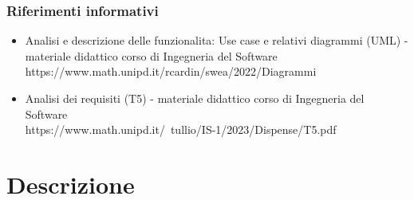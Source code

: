 \subsubsection{Riferimenti informativi}\label{sec:riferimenti_informativi}
\begin{itemize}
    \item Analisi e descrizione delle funzionalita: Use case e relativi diagrammi (UML) - materiale didattico corso
    di Ingegneria del Software\\
    https://www.math.unipd.it/rcardin/swea/2022/Diagrammi%
    \item Analisi dei requisiti (T5) - materiale didattico corso di Ingegneria del Software\\
    https://www.math.unipd.it/~tullio/IS-1/2023/Dispense/T5.pdf
\end{itemize}

\newpage

\section{Descrizione}\label{sec:descrizione}

